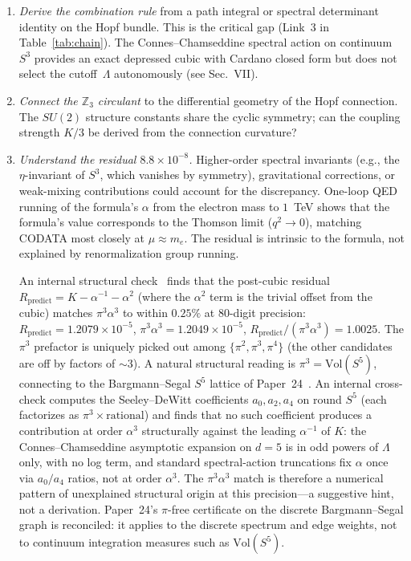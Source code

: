 \documentclass[aps,prl,twocolumn,superscriptaddress]{revtex4-2}
\begin{document}
\begin{enumerate}
\item \textit{Derive the combination rule} from a path integral or
  spectral determinant identity on the Hopf bundle. This is the
  critical gap (Link~3 in Table~\ref{tab:chain}).  The
  Connes--Chamseddine spectral action on continuum~$S^3$ provides an
  exact depressed cubic with Cardano closed form but does not select
  the cutoff~$\Lambda$ autonomously (see Sec.~VII).

\item \textit{Connect the $\mathbb{Z}_3$ circulant} to the
  differential geometry of the Hopf connection. The $SU(2)$ structure
  constants share the cyclic symmetry; can the coupling strength
  $K/3$ be derived from the connection curvature?

\item \textit{Understand the residual $8.8 \times 10^{-8}$.} Higher-order
  spectral invariants (e.g., the $\eta$-invariant of $S^3$, which
  vanishes by symmetry), gravitational corrections, or weak-mixing
  contributions could account for the discrepancy. One-loop QED
  running of the formula's $\alpha$ from the electron mass to $1$~TeV
  shows that the formula's value corresponds to the Thomson limit
  ($q^2 \to 0$), matching CODATA most closely at $\mu \approx m_e$.
  The residual is intrinsic to the formula, not explained by
  renormalization group running.

  An internal structural check~\cite{alpha_sprint_a_memo} finds that the
  post-cubic residual
  $R_{\mathrm{predict}} = K - \alpha^{-1} - \alpha^{2}$ (where the
  $\alpha^{2}$ term is the trivial offset from the cubic) matches
  $\pi^{3} \alpha^{3}$ to within $0.25\%$ at 80-digit precision:
  $R_{\mathrm{predict}} = 1.2079 \times 10^{-5}$,
  $\pi^{3}\alpha^{3} = 1.2049 \times 10^{-5}$,
  $R_{\mathrm{predict}}/(\pi^{3}\alpha^{3}) = 1.0025$. The $\pi^{3}$
  prefactor is uniquely picked out among $\{\pi^{2}, \pi^{3}, \pi^{4}\}$
  (the other candidates are off by factors of $\sim 3$). A natural
  structural reading is $\pi^{3} = \mathrm{Vol}(S^{5})$, connecting to
  the Bargmann--Segal $S^{5}$ lattice of Paper~24~\cite{paper24_bargmann}.
  An internal cross-check computes the Seeley--DeWitt coefficients
  $a_{0}, a_{2}, a_{4}$ on round $S^{5}$ (each factorizes as
  $\pi^{3} \times \text{rational}$) and finds that no such coefficient
  produces a contribution at order $\alpha^{3}$ structurally against
  the leading $\alpha^{-1}$ of $K$: the Connes--Chamseddine asymptotic
  expansion on $d = 5$ is in odd powers of $\Lambda$ only, with no log
  term, and standard spectral-action truncations fix $\alpha$ once via
  $a_{0}/a_{4}$ ratios, not at order $\alpha^{3}$. The
  $\pi^{3}\alpha^{3}$ match is therefore a numerical pattern of
  unexplained structural origin at this precision---a suggestive hint,
  not a derivation. Paper~24's $\pi$-free certificate on the discrete
  Bargmann--Segal graph is reconciled: it applies to the discrete
  spectrum and edge weights, not to continuum integration measures
  such as $\mathrm{Vol}(S^{5})$.


\end{enumerate}
\end{document}
